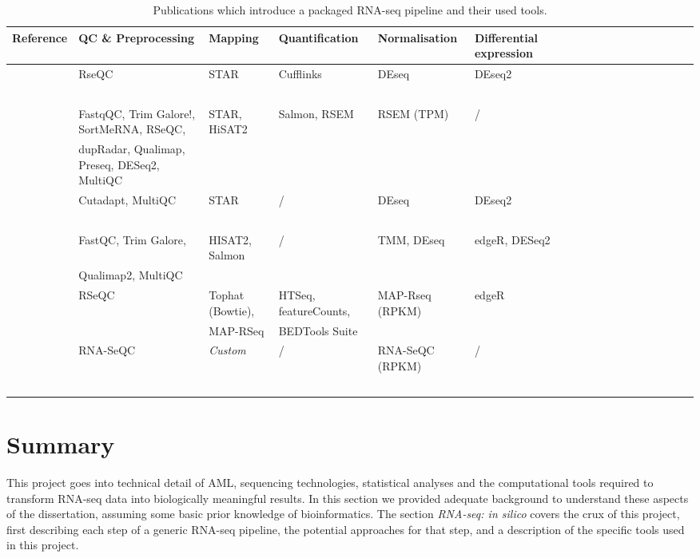 \begin{landscape}
	\pagestyle{empty}
\begin{table}[h]
	\footnotesize
    \centering
    \captionsetup{font=footnotesize}
    \caption{Publications which introduce a packaged RNA-seq pipeline and their used tools.}
	\label{tab:packaged_pipelines}
    \begin{tabular}{llllllllllllllllll}
		\toprule
        \textbf{Reference} & \textbf{QC \& Preprocessing} & \textbf{Mapping} & \textbf{Quantification} & \textbf{Normalisation} &\textbf{ Differential expression} \\ \midrule
        \cite{cornwell2018viper} & RseQC & STAR & Cufflinks &  DEseq & DEseq2  \\ 
        ~ & ~ & ~ & ~ & ~ &   \\ \hline
        \cite{ewels2020nf} & FastqQC, Trim Galore!, SortMeRNA, RSeQC,  & STAR, HiSAT2 & Salmon, RSEM & RSEM (TPM) & /  \\ 
        ~ & dupRadar, Qualimap, Preseq, DESeq2, MultiQC & ~ & ~ & ~ &   \\ \hline
        \cite{koster2021snakemake} & Cutadapt, MultiQC & STAR & / &  DEseq & DEseq2  \\ 
        ~ & ~ & ~ & ~ & ~ &   \\ \hline
        \cite{zhang2020rasflow} & FastQC, Trim Galore,  & HISAT2, Salmon  & / & TMM,  DEseq & edgeR, DESeq2   \\ 
        ~ & Qualimap2, MultiQC  & ~ & ~ & ~ &   \\ \hline
        \cite{kalari2014map} & RSeQC & Tophat (Bowtie),  & HTSeq, featureCounts,  & MAP-Rseq (RPKM) & edgeR  \\ 
        ~ & ~ & MAP-RSeq & BEDTools Suite & ~ &   \\ \hline
        \cite{torres2014prada} & RNA-SeQC  & \textit{Custom} & / & RNA-SeQC (RPKM) & /  \\ 
        ~ & ~ & ~ & ~ & ~ &  \\ \bottomrule
    \end{tabular}
\end{table}
\end{landscape}


\clearpage
\section{Summary}
This project goes into technical detail of \ac{AML}, sequencing technologies, statistical analyses and the computational tools required to transform RNA-seq data into biologically meaningful results. In this section we provided adequate background to understand these aspects of the dissertation, assuming some basic prior knowledge of bioinformatics. The section \textit{RNA-seq: in silico} covers the crux of this project, first describing each step of a generic RNA-seq pipeline, the potential approaches for that step, and a description of the specific tools used in this project.

